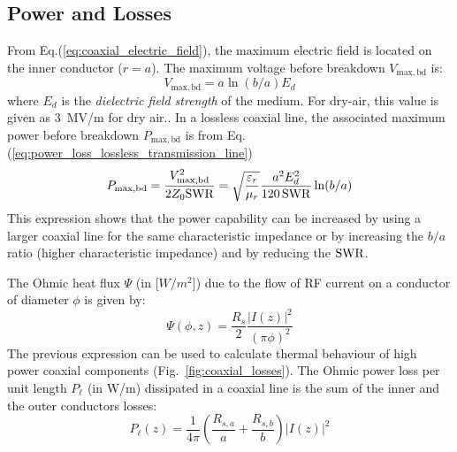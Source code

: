 \subsection{Power and Losses}
From Eq.(\ref{eq:coaxial_electric_field}), the maximum electric field is located on the inner conductor ($r=a$). The maximum voltage before breakdown $V_{\mathrm{max,bd}}$ is:
\begin{equation}
	V_{\mathrm{max,bd}} = a\ln\left(b/a\right) E_d
\end{equation}
where $E_d$ is the \textit{dielectric field strength} of the medium. For dry-air, this value is given as $3$~\si{MV/m} for dry air\cite[b§3.11]{pozar2012}.. In a lossless coaxial line, the associated maximum power before breakdown $P_\mathrm{max,bd}$ is from Eq.(\ref{eq:power_loss_lossless_transmission_line})
\begin{equation}
	P_\mathrm{max,bd} =  \frac{V^2_{\mathrm{max,bd}} }{2 Z_0 {\mathrm{SWR}}}= \sqrt{\frac{\varepsilon_{r}}{\mu_r}} \frac{a^2 E_d^2}{120\,{\mathrm{SWR}}} \ln (b/a)
\end{equation}
This expression shows that the power capability can be increased by using a larger coaxial line for the same characteristic impedance or by increasing the $b/a$ ratio (higher characteristic impedance) and by reducing the ${\mathrm{SWR}}$.

The Ohmic heat flux $\Psi$ (in [$\si{W/m^2}$]) due to the flow of RF current on a conductor of diameter $\phi$ is given by:
\begin{equation}
\Psi(\phi,z) 
=
\frac{R_s}{2}
\frac{|I(z)|^2}{(\pi \phi)^2}
\label{eq:ohmic_heat_flux_coaxial}
\end{equation}
The previous expression can be used to calculate thermal behaviour of high power coaxial components (Fig.~\ref{fig:coaxial_losses}). The Ohmic power loss per unit length $P_\ell$ (in \si{W/m}) dissipated in a coaxial line is the sum of the inner and the outer conductors losses:
\begin{equation}
P_\ell (z)
=
\frac{1}{4 \pi}
\left(
\frac{R_{s,a}}{a} + \frac{R_{s,b}}{b}
\right)
|I(z)|^2
\end{equation}


